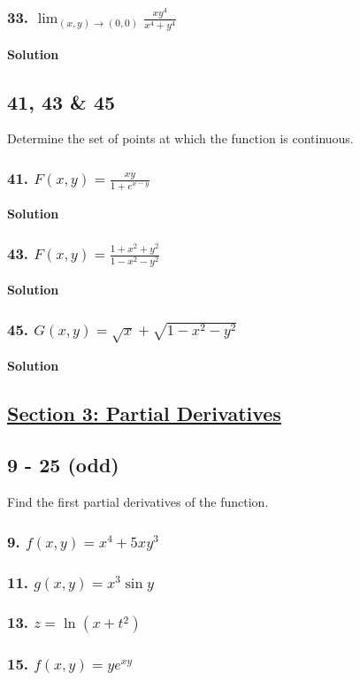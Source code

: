 \documentclass{article}
\newcommand{\limit}[4]{\lim_{(#1, #2) \to (#3, #4)}}
\begin{document}
\subsubsection*{33. $\limit x y 0 0 \displaystyle\frac{xy^4}{x^4 + y^4}$}
\centerline{\textbf{Solution}}
\subsection*{41, 43 \& 45}
Determine the set of points at which the function is continuous.
\subsubsection*{41. $F(x,y) = \displaystyle\frac{xy}{1+e^{x-y}}$}
\centerline{\textbf{Solution}}
\subsubsection*{43. $F(x,y) = \displaystyle\frac{1+x^2+y^2}{1-x^2-y^2}$}
\centerline{\textbf{Solution}}
\subsubsection*{45. $G(x,y) = \sqrt x + \sqrt{1 - x^2 - y^2}$}
\centerline{\textbf{Solution}}

\newpage
\begin{center}
    \section*{\underline{Section 3: Partial Derivatives}}
\end{center}
\subsection*{9 - 25 (odd)}
Find the first partial derivatives of the function.
\subsubsection*{9. $f(x,y) = x^4 + 5xy^3$}
\subsubsection*{11. $g(x,y) = x^3 \sin y$}
\subsubsection*{13. $z = \ln (x + t^2)$}
\subsubsection*{15. $f(x,y) = ye^{xy}$}
\end{document}
